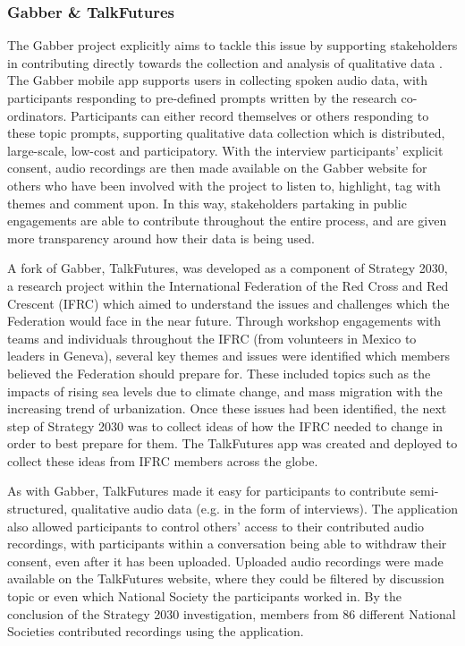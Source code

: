\subsubsection{Gabber \& TalkFutures}
The Gabber project explicitly aims to tackle this issue by supporting stakeholders in contributing directly towards the collection and analysis of qualitative data \citep{Rainey2019}. The Gabber mobile app supports users in collecting spoken audio data, with participants responding to pre-defined prompts written by the research co-ordinators. Participants can either record themselves or others responding to these topic prompts, supporting qualitative data collection which is distributed, large-scale, low-cost and participatory. With the interview participants' explicit consent, audio recordings are then made available on the Gabber website for others who have been involved with the project to listen to, highlight, tag with themes and comment upon. In this way, stakeholders partaking in public engagements are able to contribute throughout the entire process, and are given more transparency around how their data is being used.

A fork of Gabber, TalkFutures, was developed as a component of Strategy 2030, a research project within the International Federation of the Red Cross and Red Crescent (IFRC) which aimed to understand the issues and challenges which the Federation would face in the near future. Through workshop engagements with teams and individuals throughout the IFRC (from volunteers in Mexico to leaders in Geneva), several key themes and issues were identified which members believed the Federation should prepare for. These included topics such as the impacts of rising sea levels due to climate change, and mass migration with the increasing trend of urbanization. Once these issues had been identified, the next step of Strategy 2030 was to collect ideas of how the IFRC needed to change in order to best prepare for them. The TalkFutures app was created and deployed to collect these ideas from IFRC members across the globe.

As with Gabber, TalkFutures made it easy for participants to contribute semi-structured, qualitative audio data (e.g. in the form of interviews). The application also allowed participants to control others’ access to their contributed audio recordings, with participants within a conversation being able to withdraw their consent, even after it has been uploaded. Uploaded audio recordings were made available on the TalkFutures website, where they could be filtered by discussion topic or even which National Society the participants worked in. By the conclusion of the Strategy 2030 investigation, members from 86 different National Societies contributed recordings using the application.

